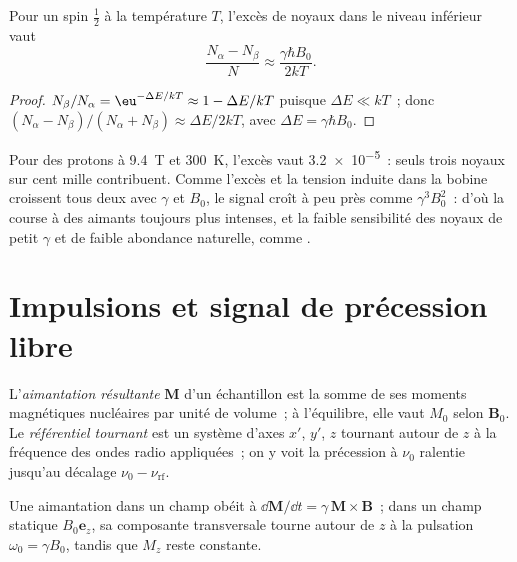 \begin{proposition}\label{prop:b3:advanced-nmr:populations}
Pour un spin $\frac12$ à la température $T$, l'excès de noyaux dans le
niveau inférieur vaut
\[
\frac{N_\alpha - N_\beta}{N} \approx \frac{\gamma\hbar B_0}{2kT}.
\]
\end{proposition}

\begin{proof}
$N_\beta/N_\alpha = \eu^{-\Delta E/kT} \approx 1 - \Delta E/kT$ puisque $\Delta E \ll kT$~; donc
$(N_\alpha - N_\beta)/(N_\alpha + N_\beta) \approx \Delta E/2kT$, avec $\Delta E = \gamma\hbar B_0$.
\end{proof}

Pour des protons à \qty{9.4}{T} et \qty{300}{K}, l'excès vaut
\num{3.2e-5}~: seuls trois noyaux sur cent mille contribuent. Comme
l'excès et la tension induite dans la bobine croissent tous deux avec
$\gamma$ et $B_0$, le signal croît à peu près comme $\gamma^3B_0^2$~: d'où
la course à des aimants toujours plus intenses, et la faible sensibilité
des noyaux de petit $\gamma$ et de faible abondance naturelle, comme
.

\section{Impulsions et signal de précession libre}

\begin{definition}\label{def:b3:advanced-nmr:magnetisation}
L'\emph{aimantation résultante} $\mathbf M$ d'un
échantillon est la somme de ses moments magnétiques nucléaires par unité
de volume~; à l'équilibre, elle vaut
$M_0$ selon $\mathbf B_0$. Le \emph{référentiel tournant}
est un système d'axes $x'$, $y'$, $z$ tournant autour de $z$ à la
fréquence des ondes radio appliquées~; on y voit la précession à
$\nu_0$ ralentie jusqu'au décalage $\nu_0 -
\nu_{\mathrm{rf}}$.
\end{definition}

\begin{proposition}[Précession]\label{prop:b3:advanced-nmr:precession}
Une aimantation dans un champ obéit à $\dd\mathbf M/\dd t = \gamma\,\mathbf M\times\mathbf B$~;
dans un champ statique $B_0\mathbf e_z$, sa composante transversale tourne
autour de $z$ à la pulsation
$\omega_0 = \gamma B_0$, tandis que $M_z$ reste constante.
\end{proposition}

